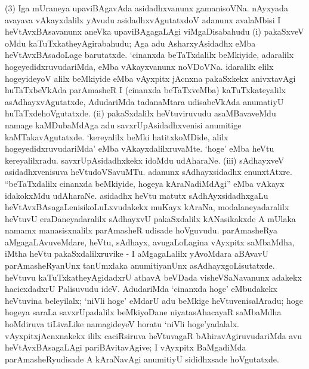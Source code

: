 (3) Iga mUraneya upaviBAgavAda asidadhxvanunx gamanisoVNa. nAyxyada avayava vAkayxdalilx yAvudu asidadhxvAgutatxdoV adanunx avalaMbisi I heVtAvxBAsa\-vanunx aneVka upaviBAgagaLAgi viMgaDisabahudu {\rm(i)} pakaSxveV oMdu kaTuTxkathe\-yAgira\-bahudu; Aga adu AsharxyAsidadhx eMba heVtAvxBAsadoLage barutatxde. `cinanxda beTaTx\-dalilx beMkiyide, adaralilx hogeyedidxruvudariMda, eMba vAkayxvanunx noVDoVNa. idaralilx elilx hogeyideyoV alilx beMkiyide eMba vAyxpitx jAcnxna pakaSxkekx anivxtavAgi huTaTxbeVkAda parAmasheR I (cinanxda beTaTxveMba) kaTuTxkateyalilx asAdhayxvAgutatxde, AdudariMda tadanaMtara udisabeVkAda anumatiyU huTaTxdehoVgutatxde. {\rm(ii)} pakaSx\-dalilx heVtuviruvudu asaMBavaveMdu namage kaMDubaMdAga adu savxrUpA\-sidadhxvenisi anu\-mitige kaMTakavAgutatxde. `kereyalilx beMki hatitxkoMDide, alilx hogeyedidxruvudariMda' eMba vAkayxdalilxruvaMte. `hoge' eMba heVtu kereyalilxradu. savxrUpA\-sidadhxkekx idoMdu udAharaNe. {\rm(iii)} sAdhayxveV asidadhxvenisuva heVtudoVSavuMTu. adanunx sAdhayx\-sidadhx enunxtAtxre. ``beTaTxdalilx cinanxda beMkiyide, hogeya kAraNadiMdAgi'' eMba vAkayx ida\-kokxMdu udAharaNe. asidadhx heVtu matutx sAdhAyxsidadhxgaLu heVtAvx\-BAsagaLenisikoLuLx\-vudakekx muKayx kAraNa, modalaneyadaralilx heVtuvU eraDaneyadaralilx sAdhayxvU pakaSx\-dalilx kANasikakxde A mUlaka namamx manasisxnalilx parAmasheR udisade hoVguvudu. parAmasheRya aMgagaLAvuveMdare, heVtu, sAdhayx, avugaLoLagina vAyxpitx saMbaMdha, iMtha heVtu pakaSxdalilxruvike - I aMgagaLalilx yAvoMdara aBAvavU parAmasheR\-yanUnx tanUmxlaka anumitiyanUnx asAdhayxgoLisutatxde. heVtuvu kaTuTxkatheyAgi\-dadxrU athavA beVDada visheVSaNavanunx adakekx hacicxdadxrU Palisuvudu ideV. AdudariMda `cinanxda hoge' eMbudakekx heVtuvina beleyilalx; `niVli hoge' eMdarU adu \hbox{beMkige} heVtuvenisalAradu; hoge hogeya saraLa savxrUpadalilx beMkiyoDane niyata\-sAha\-cayaR saMbaMdha hoMdiruva tiLivaLike namagideyeV horatu `niVli hoge'yadalalx. vAyxpitxjAcnxnakekx ililx caciRsiruva heVtuvagaR bAhiravAgiruvudariMda avu heVtAvxBAsa\-gaLAgi pariBAvitavAgive; I vAyxpitx BaMgadiMda parAmasheRyudisade A kAraNavAgi anumitiyU sididhxsade hoVgutatxde.

